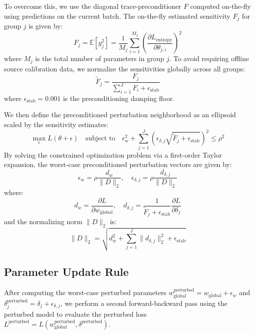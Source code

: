 \documentclass{article}
\theoremstyle{plain}
\theoremstyle{definition}
\theoremstyle{remark}
\begin{document}
To overcome this, we use the diagonal trace-preconditioner $F$ computed on-the-fly using predictions on the current batch. The on-the-fly estimated sensitivity $F_j$ for group $j$ is given by:
\begin{equation}
F_j = \mathbb{E} \left[ g_j^2 \right] = \frac{1}{M_j} \sum_{i=1}^{M_j} \left( \frac{\partial L_{\text{entropy}}}{\partial \theta_{j,i}} \right)^2
\end{equation}
where $M_j$ is the total number of parameters in group $j$. To avoid requiring offline source calibration data, we normalize the sensitivities globally across all groups:
\begin{equation}
\tilde{F}_j = \frac{F_j}{\sum_{i=1}^J F_i + \epsilon_{\text{stab}}}
\end{equation}
where $\epsilon_{\text{stab}} = 0.001$ is the preconditioning damping floor.

We then define the preconditioned perturbation neighborhood as an ellipsoid scaled by the sensitivity estimates:
\begin{equation}
\max_{\epsilon} L(\theta + \epsilon) \quad \text{subject to} \quad \epsilon_w^2 + \sum_{j=1}^J \left( \epsilon_{\delta, j} \sqrt{\tilde{F}_j + \epsilon_{\text{stab}}} \right)^2 \le \rho^2
\end{equation}
By solving the constrained optimization problem via a first-order Taylor expansion, the worst-case preconditioned perturbation vectors are given by:
\begin{equation}
\epsilon_w = \rho \frac{d_w}{\|D\|_2}, \quad \epsilon_{\delta,j} = \rho \frac{d_{\delta,j}}{\|D\|_2}
\end{equation}
where:
\begin{equation}
d_w = \frac{\partial L}{\partial w_{\text{global}}}, \quad d_{\delta,j} = \frac{1}{\tilde{F}_j + \epsilon_{\text{stab}}} \frac{\partial L}{\partial \delta_j}
\end{equation}
and the normalizing norm $\|D\|_2$ is:
\begin{equation}
\|D\|_2 = \sqrt{d_w^2 + \sum_{j=1}^J \|d_{\delta,j}\|_2^2 + \epsilon_{\text{stab}}}
\end{equation}

\subsection{Parameter Update Rule}
After computing the worst-case perturbed parameters $w_{\text{global}}^{\text{perturbed}} = w_{\text{global}} + \epsilon_w$ and $\delta_j^{\text{perturbed}} = \delta_j + \epsilon_{\delta,j}$, we perform a second forward-backward pass using the perturbed model to evaluate the perturbed loss $L^{\text{perturbed}} = L(w_{\text{global}}^{\text{perturbed}}, \delta^{\text{perturbed}})$. 
\end{document}
